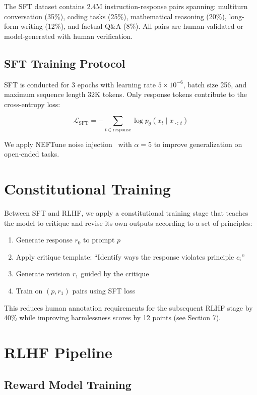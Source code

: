 \documentclass[11pt,a4paper]{article}
\begin{document}
The SFT dataset contains 2.4M instruction-response pairs spanning:
multiturn conversation (35\%), coding tasks (25\%), mathematical reasoning (20\%),
long-form writing (12\%), and factual Q\&A (8\%). All pairs are human-validated
or model-generated with human verification.

\subsection{SFT Training Protocol}

SFT is conducted for 3 epochs with learning rate $5\times10^{-6}$, batch size 256,
and maximum sequence length 32K tokens. Only response tokens contribute to the
cross-entropy loss:

\begin{equation}
\mathcal{L}_\text{SFT} = -\sum_{t \in \text{response}} \log p_\theta(x_t \mid x_{<t})
\end{equation}

We apply NEFTune noise injection~\cite{jain2023neftune} with $\alpha=5$ to improve
generalization on open-ended tasks.

\section{Constitutional Training}

Between SFT and RLHF, we apply a constitutional training stage that teaches the model
to critique and revise its own outputs according to a set of principles:

\begin{enumerate}
  \item Generate response $r_0$ to prompt $p$
  \item Apply critique template: ``Identify ways the response violates principle $c_i$''
  \item Generate revision $r_1$ guided by the critique
  \item Train on $(p, r_1)$ pairs using SFT loss
\end{enumerate}

This reduces human annotation requirements for the subsequent RLHF stage by 40\%
while improving harmlessness scores by 12 points (see Section 7).

\section{RLHF Pipeline}

\subsection{Reward Model Training}
\end{document}
